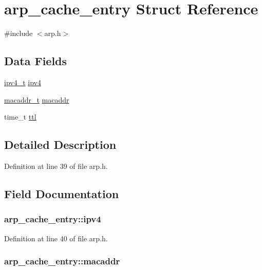 \hypertarget{structarp__cache__entry}{\section{arp\+\_\+cache\+\_\+entry Struct Reference}
\label{structarp__cache__entry}
}


{\ttfamily \#include $<$arp.\+h$>$}

\subsection*{Data Fields}
\begin{DoxyCompactItemize}
\item 
\hyperlink{netif_8h_aea29db0d4ae23303ff7591af75c7b74a}{ipv4\+\_\+t} \hyperlink{structarp__cache__entry_a0347c9b0b7ec01ff4b5a2fb258ffc9d5}{ipv4}
\item 
\hyperlink{netif_8h_a95d524a06a1ff12a314f88bac04db658}{macaddr\+\_\+t} \hyperlink{structarp__cache__entry_abc5be464b787fc7c71a45330c9b979af}{macaddr}
\item 
time\+\_\+t \hyperlink{structarp__cache__entry_a9e7f6ce0108939a15edffff4aa0fdb5a}{ttl}
\end{DoxyCompactItemize}


\subsection{Detailed Description}


Definition at line 39 of file arp.\+h.



\subsection{Field Documentation}
\hypertarget{structarp__cache__entry_a0347c9b0b7ec01ff4b5a2fb258ffc9d5}{
\subsubsection[{ipv4}]{ arp\+\_\+cache\+\_\+entry\+::ipv4}}\label{structarp__cache__entry_a0347c9b0b7ec01ff4b5a2fb258ffc9d5}


Definition at line 40 of file arp.\+h.

\hypertarget{structarp__cache__entry_abc5be464b787fc7c71a45330c9b979af}{
\subsubsection[{macaddr}]{ arp\+\_\+cache\+\_\+entry\+::macaddr}}\label{structarp__cache__entry_abc5be464b787fc7c71a45330c9b979af}


